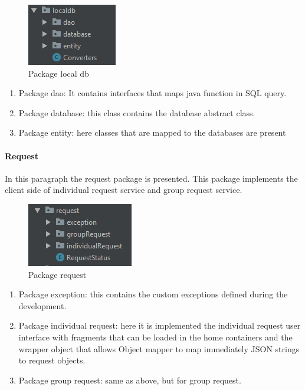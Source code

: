 \begin{figure}[H]
\includegraphics[width=0.6\linewidth]{images/LocalDB.png}
\caption{ Package local db}
\label{fig:pkgsharedata}
\end{figure}

\begin{enumerate}
\item Package dao: It contains interfaces that maps java function in SQL query.
\item Package database: this class contains the database abstract class.
\item Package entity: here classes that are mapped to the databases are present 
\end{enumerate}

\paragraph{Request}
In this paragraph the request package is presented. 
This package implements the client side of individual request service and group request service.

\begin{figure}[H]
\includegraphics[width=0.6\linewidth]{images/Request.png}
\caption{ Package request }
\label{fig:pkgsharedata}
\end{figure}

\begin{enumerate}
\item Package exception: this contains the custom exceptions defined during the development.
\item Package individual request: here it is implemented the individual request user interface with fragments that can be loaded in the home
containers and the wrapper object that allows Object mapper to map immediately JSON strings to request objects. 
\item Package group request: same as above, but for group request. 
\end{enumerate}
	
